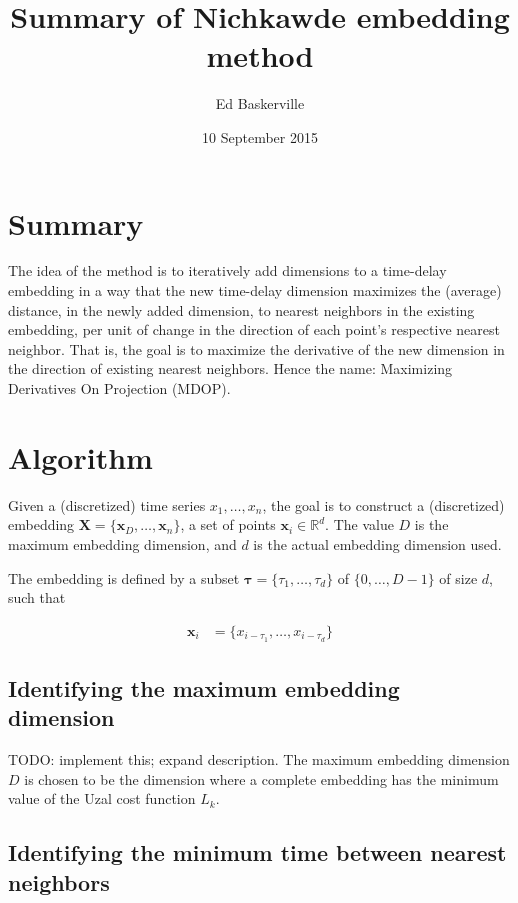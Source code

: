 \documentclass[10pt]{article}
\title{Summary of Nichkawde embedding method}
\author{Ed Baskerville}
\date{10 September 2015}
\newcommand{\bx}{\mathbf{x}}
\newcommand{\bX}{\mathbf{X}}
\newcommand{\btau}{\boldsymbol{\tau}}
\newcommand{\reals}{\mathbb{R}}
\begin{document}
\maketitle


\section{Summary}

The idea of the method is to iteratively add dimensions to a time-delay embedding in a way that the new time-delay dimension maximizes the (average) distance, in the newly added dimension, to nearest neighbors in the existing embedding, per unit of change in the direction of each point's respective nearest neighbor. That is, the goal is to maximize the derivative of the new dimension in the direction of existing nearest neighbors. Hence the name: Maximizing Derivatives On Projection (MDOP).

\section{Algorithm}

Given a (discretized) time series $x_1, \ldots, x_n$, the goal is to construct a (discretized) embedding $\bX = \{ \bx_D, \ldots, \bx_n \}$, a set of points $\bx_i \in \reals^d$. The value $D$ is the maximum embedding dimension, and $d$ is the actual embedding dimension used.

The embedding is defined by a subset $\btau = \{ \tau_1, \ldots, \tau_d \}$ of $\{0, \ldots, D - 1 \}$ of size $d$, such that

\begin{align}
\bx_i &= \{ x_{i - \tau_1}, \ldots , x_{i - \tau_d} \}
\end{align}

\subsection{Identifying the maximum embedding dimension}

TODO: implement this; expand description. The maximum embedding dimension $D$ is chosen to be the dimension where a complete embedding has the minimum value of the Uzal cost function $L_k$.

\subsection{Identifying the minimum time between nearest neighbors}
\end{document}

